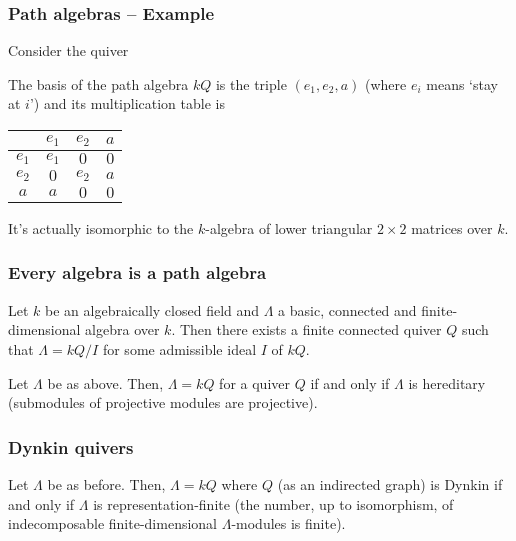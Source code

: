 \begin{frame}[fragile]
 \frametitle{Path algebras -- Example}
 Consider the quiver
 \begin{figure}[h]
  \centering
 \end{figure}

 \pause
 The basis of the path algebra $kQ$ is the triple $(e_1,e_2,a)$ (where $e_i$
 means `stay at $i$') and its multiplication table is
 \begin{table}[h]
  \centering
  \begin{tabular}{c|ccc}
   & $e_1$ & $e_2$ & $a$ \\
   \toprule
   $e_1$ & $e_1$ & $0$ & $0$\\
   $e_2$ & $0$ & $e_2$ & $a$\\
   $a$ & $a$ & $0$ & $0$
  \end{tabular}
 \end{table}

 \pause

 It's actually isomorphic to the $k$-algebra of lower triangular $2 \times 2$
 matrices over $k$.
\end{frame}

\begin{frame}
 \frametitle{Every algebra is a path algebra}
 \begin{theorem}
 	Let $k$ be an algebraically closed field and $\Lambda$ a basic, connected and
 	finite-dimensional algebra over $k$. Then there exists a finite connected
 	quiver $Q$ such that $\Lambda = kQ / I$ for some admissible ideal $I$ of $kQ$.
 \end{theorem}
 \pause
 \begin{theorem}
 	Let $\Lambda$ be as above. Then, $\Lambda = kQ$ for a quiver $Q$ if and only
 	if $\Lambda$ is \alert{hereditary} (submodules of projective modules are
 	projective).
 \end{theorem}
\end{frame}

\begin{frame}
 \frametitle{Dynkin quivers}
 \begin{theorem}[Gabriel's]
 	Let $\Lambda$ be as before. Then, $\Lambda = kQ$ where $Q$ (as an indirected
 	graph) is \alert{Dynkin} if and only if $\Lambda$ is
 	\alert{representation-finite} (the number, up to isomorphism, of
 	indecomposable finite-dimensional $\Lambda$-modules is finite).
 \end{theorem}
\end{frame}

